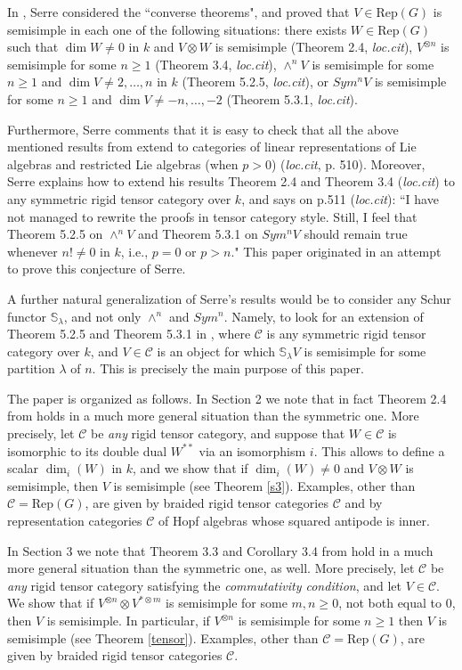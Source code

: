\documentclass{amsart}
\theoremstyle{definition}
\newcommand{\Rep}{\text{Rep}}
\newcommand{\C}{{\mathcal C}}
\begin{document}
In \cite{s1}, Serre considered the ``converse theorems", and proved
that $V\in \Rep(G)$ is semisimple in each one of the following
situations: there exists $W\in \Rep(G)$ such that $\dim W\ne 0$ in
$k$ and $V\otimes W$ is semisimple (Theorem 2.4, {\em loc.cit}),
$V^{\otimes n}$ is semisimple for some $n\ge 1$ (Theorem 3.4, {\em
loc.cit}), $\wedge^n V$ is semisimple for some $n\ge 1$ and $\dim
V\ne 2,\dots,n$ in $k$ (Theorem 5.2.5, {\em loc.cit}), or $Sym^n V$
is semisimple for some $n\ge 1$ and $\dim V\ne -n,\dots,-2$ (Theorem
5.3.1, {\em loc.cit}).

Furthermore, Serre comments that it is easy to check that all the
above mentioned results from \cite{s1} extend to categories of
linear representations of Lie algebras and restricted Lie algebras
(when $p>0$) ({\em loc.cit}, p. 510). Moreover, Serre explains how
to extend his results Theorem 2.4 and Theorem 3.4 ({\em loc.cit}) to
any symmetric rigid tensor category over $k$, and says on p.511
({\em loc.cit}): ``I have not managed to rewrite the proofs in
tensor category style. Still, I feel that Theorem 5.2.5 on $\wedge^n
V$ and Theorem 5.3.1 on $Sym^n V$ should remain true whenever $n!\ne
0$ in $k$, i.e., $p=0$ or $p>n$." This paper originated in an
attempt to prove this conjecture of Serre.

A further natural generalization of Serre's results would be to
consider any Schur functor $\mathbb{S}_{\lambda}$, and not only
$\wedge^n$ and $Sym^n$. Namely, to look for an extension of Theorem
5.2.5 and Theorem 5.3.1 in \cite{s1}, where $\C$ is any symmetric
rigid tensor category over $k$, and $V\in \C$ is an object for which
$\mathbb{S}_{\lambda}V$ is semisimple for some partition $\lambda$
of $n$. This is precisely the main purpose of this paper.

The paper is organized as follows. In Section 2 we note that in fact
Theorem 2.4 from \cite{s1} holds in a much more general situation
than the symmetric one. More precisely, let $\mathcal{C}$ be {\em
any} rigid tensor category, and suppose that $W\in\C$ is isomorphic
to its double dual $W^{**}$ via an isomorphism $i$. This allows to
define a scalar $\dim_i(W)$ in $k$, and we show that if
$\dim_i(W)\ne 0$ and $V\otimes W$ is semisimple, then $V$ is
semisimple (see Theorem \ref{s3}). Examples, other than
$\C=\Rep(G)$, are given by braided rigid tensor categories $\C$ and
by representation categories $\C$ of Hopf algebras whose squared
antipode is inner.

In Section 3 we note that Theorem 3.3 and Corollary 3.4 from
\cite{s1} hold in a much more general situation than the symmetric
one, as well. More precisely, let $\mathcal{C}$ be {\em any} rigid
tensor category satisfying the {\em commutativity condition}, and
let $V\in \C$. We show that if $V^{\otimes n}\otimes V^{*\otimes m}$
is semisimple for some $m,n\ge 0$, not both equal to $0$, then $V$
is semisimple. In particular, if $V^{\otimes n}$ is semisimple for
some $n\ge 1$ then $V$ is semisimple (see Theorem \ref{tensor}).
Examples, other than $\C=\Rep(G)$, are given by braided rigid tensor
categories $\C$.
\end{document}
